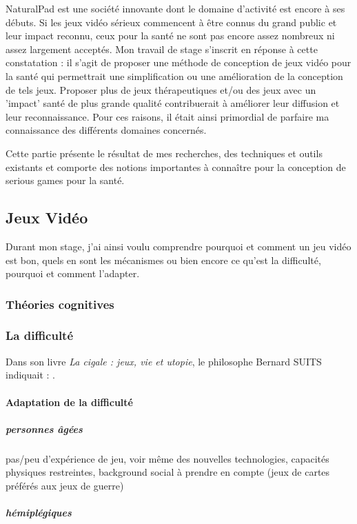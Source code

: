 NaturalPad est une société innovante dont le domaine d'activité est encore à ses débuts. Si les jeux vidéo sérieux commencent à être connus du grand public et leur impact reconnu, ceux pour la santé ne sont pas encore assez nombreux ni assez largement acceptés. Mon travail de stage s'inscrit en réponse à cette constatation : il s'agit de proposer une méthode de conception de jeux vidéo pour la santé qui permettrait une simplification ou une amélioration de la conception de tels jeux. Proposer plus de jeux  thérapeutiques et/ou des jeux avec un 'impact' santé de plus grande qualité contribuerait à améliorer leur diffusion et leur reconnaissance. Pour ces raisons, il était ainsi primordial de parfaire ma connaissance des différents domaines concernés.

Cette partie présente le résultat de mes recherches, des techniques et outils existants et comporte des notions importantes à connaître pour la conception de serious games pour la santé.

	\subsection{Jeux Vidéo}
Durant mon stage, j'ai ainsi voulu comprendre pourquoi et comment un jeu vidéo est bon, quels en sont les mécanismes ou bien encore ce qu'est la difficulté, pourquoi et comment l'adapter.\\

		\subsubsection{Théories cognitives}
		
		\subsubsection{La difficulté}
Dans son livre \emph{La cigale : jeux, vie et utopie}, le philosophe Bernard SUITS indiquait : .
		
			\paragraph{Adaptation de la difficulté}
				\subparagraph{personnes âgées}
pas/peu d'expérience de jeu, voir même des nouvelles technologies, capacités physiques restreintes, background social à prendre en compte (jeux de cartes préférés aux jeux de guerre) \cite{Csik75}
				\subparagraph{hémiplégiques}			
